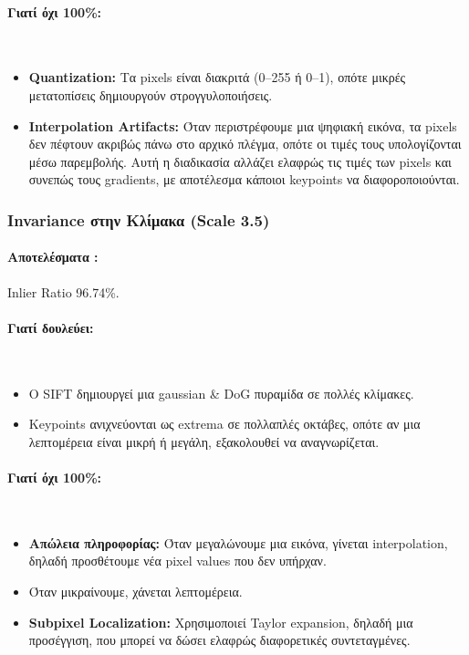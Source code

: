 \documentclass[12pt]{article}
\begin{document}
\paragraph{Γιατί όχι 100\%:}
\mbox{}\\
\begin{itemize}
  \item \textbf{Quantization: }Τα pixels είναι διακριτά (0–255 ή 0–1), οπότε μικρές μετατοπίσεις δημιουργούν στρογγυλοποιήσεις.
  \item \textbf{Interpolation Artifacts: }Όταν περιστρέφουμε μια ψηφιακή εικόνα, τα pixels δεν πέφτουν ακριβώς πάνω στο αρχικό πλέγμα, οπότε οι τιμές τους υπολογίζονται μέσω παρεμβολής. 
  Αυτή η διαδικασία αλλάζει ελαφρώς τις τιμές των pixels και συνεπώς τους gradients, με αποτέλεσμα κάποιοι keypoints να διαφοροποιούνται.
\end{itemize}


\subsubsection{Invariance στην Κλίμακα (Scale 3.5)}
\paragraph{Αποτελέσματα : }Inlier Ratio 96.74\%.
\mbox{}\\


\paragraph{Γιατί δουλεύει:}
\mbox{}\\
\begin{itemize}
  \item Ο SIFT δημιουργεί μια gaussian \& DoG πυραμίδα σε πολλές κλίμακες.
  \item Keypoints ανιχνεύονται ως extrema σε πολλαπλές οκτάβες, οπότε αν μια λεπτομέρεια είναι μικρή ή μεγάλη, εξακολουθεί να αναγνωρίζεται.
\end{itemize}


\paragraph{Γιατί όχι 100\%:}
\mbox{}\\
\begin{itemize}
  \item \textbf{Απώλεια πληροφορίας: }Όταν μεγαλώνουμε μια εικόνα, γίνεται interpolation, δηλαδή προσθέτουμε νέα pixel values που δεν υπήρχαν.
  \item Όταν μικραίνουμε, χάνεται λεπτομέρεια.
  \item \textbf{Subpixel Localization: }Χρησιμοποιεί Taylor expansion, δηλαδή μια προσέγγιση, που μπορεί να δώσει ελαφρώς διαφορετικές συντεταγμένες.
\end{itemize}
\end{document}
